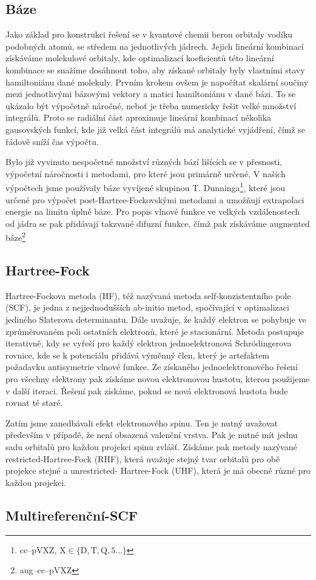 \subsection{Báze}
Jako základ pro konstrukci řešení se v kvantové chemii berou orbitaly vodíku podobných 
atomů, se středem na jednotlivých jádrech. Jejich lineární kombinací získáváme 
molekulové orbitaly, kde optimalizací koeficientů této lineární kombinace se snažíme 
dosáhnout toho, aby získané orbitaly byly vlastními stavy hamiltoniánu dané molekuly.
Prvním krokem ovšem je napočítat skalární součiny mezi jednotlivými bázovými vektory a 
matici hamiltoniánu v dané bázi. To se ukázalo být výpočetně náročné, neboť je třeba 
numericky řešit velké množství integrálů. Proto se radiální část aproximuje lineární 
kombinací několika gausovských funkcí, kde již velká část integrálů má analytické 
vyjádření, čímž se řádově sníží čas výpočtu.

Bylo již vyvinuto nespočetné množství různých bází lišících se v přesnosti, výpočetní 
náročnosti i metodami, pro které jsou primárně určené.
V našich výpočtech jsme používaly báze vyvíjené 
skupinou T. Dunninga\footnote{cc--pVXZ,  $\mathrm{ X \in \{D,T,Q,5\dots\}}$}\cite{Dunning-basis}, 
které jsou určené pro výpočet post-Hartree-Fockovskými metodami a umožňují extrapolaci 
energie na limitu úplné báze.
Pro popis vlnové funkce ve velkých vzdálenostech od jádra se pak přidávají takzvané 
difuzní funkce, čímž pak získáváme augmented báze\footnote{aug--cc--pVXZ}

\subsection{Hartree-Fock}
Hartree-Fockova metoda (HF), též nazývaná metoda self-konzistentního pole (SCF), je jedna z 
nejjednodušších ab-initio metod, spočívající v optimalizaci jediného Slaterova 
determinantu. Dále uvažuje, že každý elektron se pohybuje ve zprůměrovaném poli 
ostatních elektronů, které je stacionární.
Metoda postupuje iterativně, kdy se vyřeší pro každý elektron jednoelektronová  
Schrödingerova rovnice, kde se k potenciálu přidává výměnný člen, který je artefaktem 
požadavku antisymetrie vlnové funkce. Ze získaného jednoelektronového řešení pro 
všechny elektrony pak získáme novou elektronovou hustotu, kterou použijeme v další 
iteraci. Řešení pak získáme, pokud se nová elektronová hustota bude rovnat té staré.

Zatím jsme zanedbávali efekt elektronového spinu. Ten je nutný uvažovat především v 
případě, že není obsazená valenční vrstva. Pak je nutné mít jednu sadu orbitalů pro 
každou projekci spinu zvlášť. Získáme pak metody nazývané restricted-Hartree-Fock 
(RHF), která uvažuje stejný tvar orbitalů pro obě projekce stejné a unrestricted-
Hartree-Fock (UHF), která je má obecně různé pro každou projekci.

\subsection{Multireferenční-SCF}

